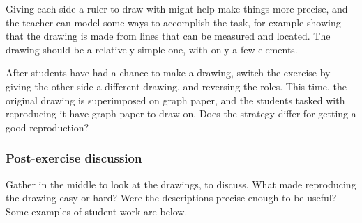 \documentclass[11pt]{article}
\begin{document}
Giving each side a ruler to draw with might help make things more
precise, and the teacher can model some ways to accomplish the task,
for example showing that the drawing is made from lines that can be
measured and located.  The drawing should be a relatively simple one,
with only a few elements.

After students have had a chance to make a drawing, switch the
exercise by giving the other side a different drawing, and reversing
the roles.  This time, the original drawing is superimposed on graph
paper, and the students tasked with reproducing it have graph paper to
draw on.  Does the strategy differ for getting a good reproduction?

\subsubsection{Post-exercise discussion}

Gather in the middle to look at the drawings, to discuss.  What made
reproducing the drawing easy or hard?  Were the descriptions precise
enough to be useful?  Some examples of student work are below.
\end{document}
